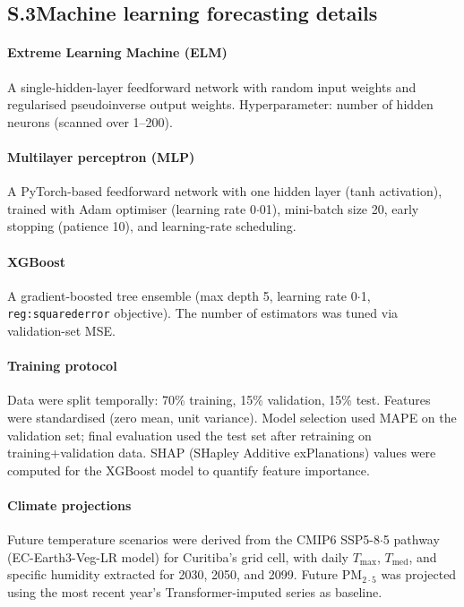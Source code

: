 \documentclass[12pt]{article}
\begin{document}
\subsection*{S.3\quad Machine learning forecasting details}

\paragraph{Extreme Learning Machine (ELM)}
A single-hidden-layer feedforward network with random input weights
and regularised pseudoinverse output weights. Hyperparameter: number
of hidden neurons (scanned over 1--200).

\paragraph{Multilayer perceptron (MLP)}
A PyTorch-based feedforward network with one hidden layer (tanh
activation), trained with Adam optimiser (learning rate 0${\cdot}$01),
mini-batch size 20, early stopping (patience 10), and learning-rate
scheduling.

\paragraph{XGBoost}
A gradient-boosted tree ensemble (max depth 5, learning rate
0${\cdot}$1, \texttt{reg:squarederror} objective). The number of
estimators was tuned via validation-set MSE.

\paragraph{Training protocol}
Data were split temporally: 70\% training, 15\% validation, 15\%
test. Features were standardised (zero mean, unit variance). Model
selection used MAPE on the validation set; final evaluation used the
test set after retraining on training+validation data. SHAP (SHapley
Additive exPlanations) values were computed for the XGBoost model to
quantify feature importance.

\paragraph{Climate projections}
Future temperature scenarios were derived from the CMIP6 SSP5-8${\cdot}$5
pathway (EC-Earth3-Veg-LR model) for Curitiba's grid cell, with daily
$T_\mathrm{max}$, $T_\mathrm{med}$, and specific humidity extracted
for 2030, 2050, and 2099. Future $\text{PM}_{2{\cdot}5}$ was projected using
the most recent year's Transformer-imputed series as baseline.
\end{document}
